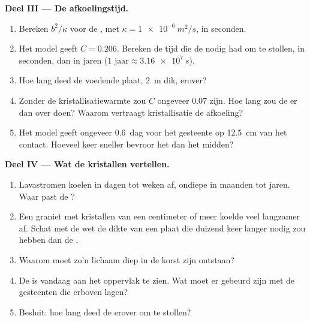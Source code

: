 \begin{problem}
\medskip
\noindent\textbf{Deel III --- De afkoelingstijd.}
\begin{enumerate}[resume]
  \item Bereken $b^2/\kappa$ voor de , met $\kappa = \qty{1e-6}{m^2/s}$,
        in seconden.
  \item Het model geeft $C = 0.206$. Bereken de tijd die de  nodig had om te stollen, in
        seconden, dan in jaren ($\num{1}\text{ jaar} \approx \qty{3.16e7}{s}$).
  \item Hoe lang deed de voedende plaat, \qty{2}{m} dik, erover?
  \item Zonder de kristallisatiewarmte zou $C$ ongeveer $0.07$ zijn.
        Hoe lang zou de  er dan over doen? Waarom vertraagt kristallisatie de
        afkoeling?
  \item Het model geeft ongeveer \num{0.6}~dag voor het gesteente op \qty{12.5}{cm}
        van het contact. Hoeveel keer sneller bevroor het dan het
        midden?
\end{enumerate}

\medskip
\noindent\textbf{Deel IV --- Wat de kristallen vertellen.}
\begin{enumerate}[resume]
  \item Lavastromen koelen in dagen tot weken af, ondiepe  in maanden tot
        jaren. Waar past de ?
  \item Een graniet met kristallen van een centimeter of meer koelde veel
        langzamer af. Schat met de wet de dikte van een plaat die
        duizend keer langer nodig zou hebben dan de .
  \item Waarom moet zo'n lichaam diep in de korst zijn ontstaan?
  \item De  is vandaag aan het oppervlak te zien. Wat moet er gebeurd zijn met
        de gesteenten die erboven lagen?
  \item Besluit: hoe lang deed de  erover om te stollen?
\end{enumerate}
\end{problem}
